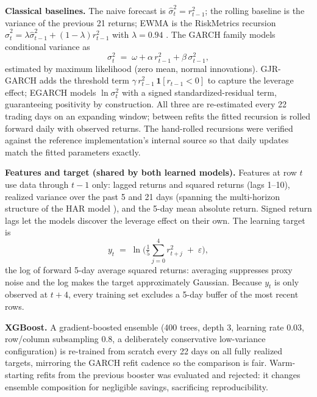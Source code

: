 \documentclass[a4paper,twocolumn,10pt]{article}
\begin{document}
\textbf{Classical baselines.} The naive forecast is $\hat\sigma_t^2=r_{t-1}^2$; the rolling baseline is the variance of the previous 21 returns; EWMA is the RiskMetrics recursion $\hat\sigma_t^2=\lambda\hat\sigma_{t-1}^2+(1-\lambda)r_{t-1}^2$ with $\lambda=0.94$ \cite{riskmetrics1996}. The GARCH family models conditional variance as
\begin{equation}
\sigma_t^2 \;=\; \omega + \alpha\, r_{t-1}^2 + \beta\, \sigma_{t-1}^2 ,
\label{eq:garch}
\end{equation}
estimated by maximum likelihood (zero mean, normal innovations). GJR-GARCH \cite{glosten1993} adds the threshold term $\gamma\, r_{t-1}^2\,\mathbf{1}[r_{t-1}<0]$ to capture the leverage effect; EGARCH \cite{nelson1991} models $\ln\sigma_t^2$ with a signed standardized-residual term, guaranteeing positivity by construction. All three are re-estimated every 22 trading days on an expanding window; between refits the fitted recursion is rolled forward daily with observed returns. The hand-rolled recursions were verified against the reference implementation's internal source so that daily updates match the fitted parameters exactly.

\textbf{Features and target (shared by both learned models).} Features at row $t$ use data through $t-1$ only: lagged returns and squared returns (lags 1--10), realized variance over the past 5 and 21 days (spanning the multi-horizon structure of the HAR model \cite{corsi2009}), and the 5-day mean absolute return. Signed return lags let the models discover the leverage effect on their own. The learning target is
\begin{equation}
y_t \;=\; \ln\Big(\tfrac{1}{5}\textstyle\sum_{j=0}^{4} r_{t+j}^2 \;+\; \varepsilon\Big),
\label{eq:target}
\end{equation}
the log of forward 5-day average squared returns: averaging suppresses proxy noise and the log makes the target approximately Gaussian. Because $y_t$ is only observed at $t+4$, every training set excludes a 5-day buffer of the most recent rows.

\textbf{XGBoost.} A gradient-boosted ensemble (400 trees, depth 3, learning rate 0.03, row/column subsampling 0.8, a deliberately conservative low-variance configuration) is re-trained from scratch every 22 days on all fully realized targets, mirroring the GARCH refit cadence so the comparison is fair. Warm-starting refits from the previous booster was evaluated and rejected: it changes ensemble composition for negligible savings, sacrificing reproducibility.
\end{document}
